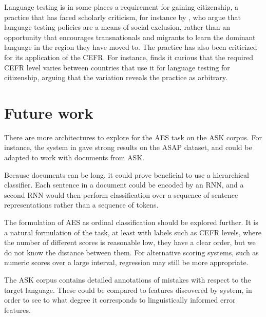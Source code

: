 Language testing is in some places a requirement for gaining citizenship, a
practice that has faced scholarly criticism, for instance by
\textcite[162]{weberhorner}, who argue that language testing policies are a
means of social exclusion, rather than an opportunity that encourages
transnationals and migrants to learn the dominant language in the region they
have moved to. The practice has also been criticized for its application of
the \ac{CEFR}. For instance, \textcite{van2009fortress} finds it curious that
the required CEFR level varies between countries that use it for language
testing for citizenship, arguing that the variation reveals the practice as
arbitrary.


\section{Future work}

There are more architectures to explore for the \ac{AES} task on the ASK
corpus. For instance, the system in \textcite{alikaniotis2016automatic} gave
strong results on the ASAP dataset, and could be adapted to work with
documents from ASK.

Because documents can be long, it could prove beneficial to use a
hierarchical classifier. Each sentence in a document could be encoded by an
RNN, and a second RNN would then perform classification over a sequence of
sentence representations rather than a sequence of tokens.

The formulation of \ac{AES} as ordinal classification should be explored
further. It is a natural formulation of the task, at least with labels such
as \ac{CEFR} levels, where the number of different scores is reasonable low,
they have a clear order, but we do not know the distance between them. For
alternative scoring systems, such as numeric scores over a large interval,
regression may still be more appropriate.

The ASK corpus contains detailed annotations of mistakes with respect to the
target language. These could be compared to features discovered by 
system, in order to see to what degree it corresponds to linguistically
informed error features.
